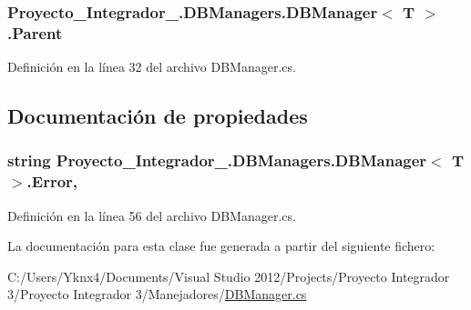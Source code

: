 \hypertarget{class_proyecto___integrador__3_1_1_d_b_managers_1_1_d_b_manager_3_01_t_01_4_a06315e75298c8f2fd46f32dc7c9a80b2}{
\subsubsection[{Parent}]{ Proyecto\-\_\-\-Integrador\-\_.\-D\-B\-Managers.\-D\-B\-Manager$<$ T $>$.Parent\hspace{0.3cm}{\ttfamily [protected]}}}\label{class_proyecto___integrador__3_1_1_d_b_managers_1_1_d_b_manager_3_01_t_01_4_a06315e75298c8f2fd46f32dc7c9a80b2}


Definición en la línea 32 del archivo D\-B\-Manager.\-cs.



\subsection{Documentación de propiedades}
\hypertarget{class_proyecto___integrador__3_1_1_d_b_managers_1_1_d_b_manager_3_01_t_01_4_a6e5caaed2ee1a4d067dfbf5aaa1b1fa8}{
\subsubsection[{Error}]{\setlength{\rightskip}{0pt plus 5cm}string Proyecto\-\_\-\-Integrador\-\_.\-D\-B\-Managers.\-D\-B\-Manager$<$ T $>$.Error\hspace{0.3cm}{\ttfamily [get]}, {\ttfamily [set]}}}\label{class_proyecto___integrador__3_1_1_d_b_managers_1_1_d_b_manager_3_01_t_01_4_a6e5caaed2ee1a4d067dfbf5aaa1b1fa8}


Definición en la línea 56 del archivo D\-B\-Manager.\-cs.



La documentación para esta clase fue generada a partir del siguiente fichero\-:\begin{DoxyCompactItemize}
\item 
C\-:/\-Users/\-Yknx4/\-Documents/\-Visual Studio 2012/\-Projects/\-Proyecto Integrador 3/\-Proyecto Integrador 3/\-Manejadores/\hyperlink{_d_b_manager_8cs}{D\-B\-Manager.\-cs}\end{DoxyCompactItemize}
